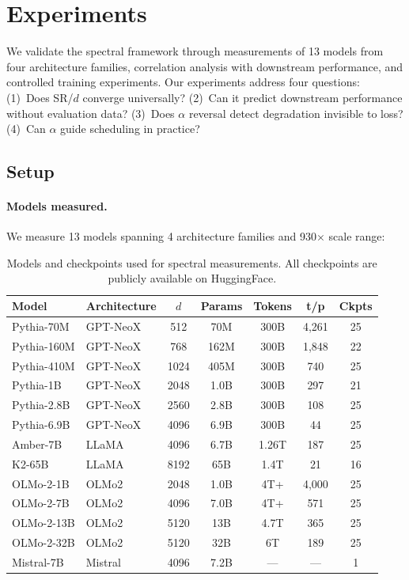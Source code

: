 \section{Experiments}
\label{sec:experiments}

We validate the spectral framework through measurements of 13 models from four architecture families, correlation analysis with downstream performance, and controlled training experiments. Our experiments address four questions: (1)~Does SR/$d$ converge universally? (2)~Can it predict downstream performance without evaluation data? (3)~Does $\alpha$ reversal detect degradation invisible to loss? (4)~Can $\alpha$ guide scheduling in practice?

\subsection{Setup}
\label{sec:setup}

\paragraph{Models measured.} We measure 13 models spanning 4 architecture families and 930$\times$ scale range:

\begin{table}[t]
\centering
\small
\caption{Models and checkpoints used for spectral measurements. All checkpoints are publicly available on HuggingFace.}
\label{tab:models}
\begin{tabular}{@{}llccccc@{}}
\toprule
\textbf{Model} & \textbf{Architecture} & $d$ & \textbf{Params} & \textbf{Tokens} & \textbf{t/p} & \textbf{Ckpts} \\
\midrule
Pythia-70M & GPT-NeoX & 512 & 70M & 300B & 4,261 & 25 \\
Pythia-160M & GPT-NeoX & 768 & 162M & 300B & 1,848 & 22 \\
Pythia-410M & GPT-NeoX & 1024 & 405M & 300B & 740 & 25 \\
Pythia-1B & GPT-NeoX & 2048 & 1.0B & 300B & 297 & 21 \\
Pythia-2.8B & GPT-NeoX & 2560 & 2.8B & 300B & 108 & 25 \\
Pythia-6.9B & GPT-NeoX & 4096 & 6.9B & 300B & 44 & 25 \\
\midrule
Amber-7B & LLaMA & 4096 & 6.7B & 1.26T & 187 & 25 \\
K2-65B & LLaMA & 8192 & 65B & 1.4T & 21 & 16 \\
\midrule
OLMo-2-1B & OLMo2 & 2048 & 1.0B & 4T+ & 4,000 & 25 \\
OLMo-2-7B & OLMo2 & 4096 & 7.0B & 4T+ & 571 & 25 \\
OLMo-2-13B & OLMo2 & 5120 & 13B & 4.7T & 365 & 25 \\
OLMo-2-32B & OLMo2 & 5120 & 32B & 6T & 189 & 25 \\
\midrule
Mistral-7B & Mistral & 4096 & 7.2B & --- & --- & 1 \\
\bottomrule
\end{tabular}
\end{table}

